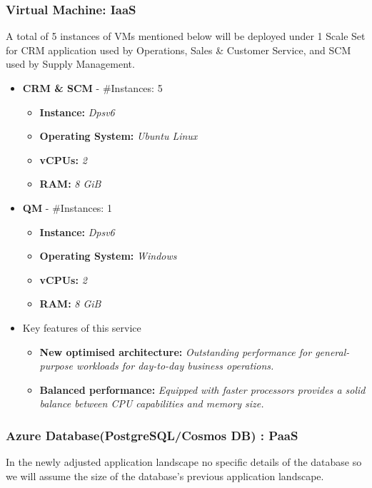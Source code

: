 \documentclass{llncs}
\begin{document}
\subsubsection{Virtual Machine: IaaS} \leavevmode\newline
A total of 5 instances of VMs mentioned below will be deployed under 1 Scale Set for CRM application used by Operations, Sales \& Customer Service, and SCM used by Supply Management.
\begin{itemize}
    \item \textbf{CRM \& SCM} - \#Instances: 5
          \begin{itemize}
              \item \textbf{Instance:} \textit{Dpsv6}
              \item  \textbf{Operating System:} \textit{Ubuntu Linux}
              \item  \textbf{vCPUs:} \textit{2}
              \item  \textbf{RAM:} \textit{8 GiB}
          \end{itemize}
    \item \textbf{QM} - \#Instances: 1
          \begin{itemize}
              \item \textbf{Instance:} \textit{Dpsv6}
              \item  \textbf{Operating System:} \textit{Windows}
              \item  \textbf{vCPUs:} \textit{2}
              \item  \textbf{RAM:} \textit{8 GiB}
          \end{itemize}
    \item Key features of this service
          \begin{itemize}
              \item  \textbf{New optimised architecture:} \textit{Outstanding performance for general-purpose workloads for day-to-day business operations.}
              \item  \textbf{Balanced performance:} \textit{Equipped with faster processors provides a solid balance between CPU capabilities and memory size.}
          \end{itemize}
\end{itemize}

\subsubsection{Azure Database(PostgreSQL/Cosmos DB) : PaaS \cite{azuredatabase}} \leavevmode\newline
In the newly adjusted application landscape no specific details of the database so we will assume the size of the database's previous application landscape.
\end{document}
